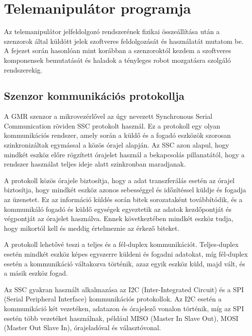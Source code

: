 \chapter{Telemanipulátor programja}
\label{sec:LatexTools}

Az telemanipulátor jelfeldolgozó rendszerének fizikai összeállítása után a szenzorok által küldött jelek szoftveres feldolgozását és használatát mutatom be. A fejezet során hasonlóan mint korábban a szenzoroktól kezdem a szoftveres komponensek bemutatását és haladok a tényleges robot mozgatásra szolgáló rendszerekig.

\section{Szenzor kommunikációs protokollja}
A GMR szenzor a mikrovezérlővel az úgy nevezett Synchronous Serial Communication  röviden SSC protokolt használ. Ez a  protokoll egy olyan kommunikációs rendszer, amely során a küldő és a fogadó eszközök szorosan szinkronizáltak egymással a közös órajel alapján. Az SSC azon alapul, hogy mindkét eszköz előre rögzített órajelet használ a bekapcsolás pillanatától, hogy a rendszer használat teljes ideje alatt szinkronban maradjanak.

A protokoll közös órajele biztosítja, hogy a adat transzferálás esetén az órajel biztosítja, hogy mindkét eszköz azonos sebességgel és időzítéssel küldje és fogadja az üzenetet. Ez az információ küldés során bitek sorozataként továbbítódik, és a kommunikáló fogadó és küldő egységek egyeztetik az adatok kezdőpontját és végpontját az órajelet használva. Ennek következtében mindkét eszköz tudja, hogy mikortól kell és meddig értelmeznie az érkező biteket.


A protokoll lehetővé teszi a teljes és a fél-duplex kommunikációt. Teljes-duplex esetén mindkét eszköz képes egyszerre küldeni és fogadni adatokat, míg fél-duplex esetén a kommunikáció váltakozva történik, azaz egyik eszköz küld, majd vált, és a másik eszköz fogad.

Az SSC gyakran használt alkalmazása az I2C (Inter-Integrated Circuit) és a SPI (Serial Peripheral Interface) kommunikációs protokollok. Az I2C esetén a kommunikáció két vezetéken, adatazon és órajelező vonalon történik, míg az SPI esetén több vezetéket használnak, például MISO (Master In Slave Out), MOSI (Master Out Slave In), órajeladóval és választóvonal.

